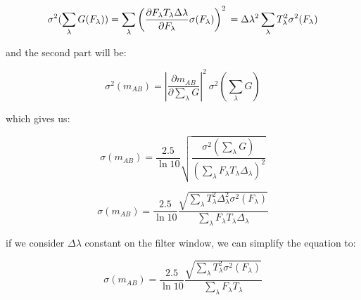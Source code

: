 \documentclass[11pt]{article}
\begin{document}
\begin{equation}
\sigma^2(\sum_\lambda G(F_\lambda))
= \sum_\lambda \left( \frac{\partial F_\lambda T_\lambda \Delta\lambda}{\partial F_\lambda} \sigma(F_\lambda) \right)^2 \\
= \Delta\lambda^2 \sum_\lambda T^2_\lambda \sigma^2(F_\lambda)
\end{equation}

\newpage{}

and the second part will be:

\begin{equation}
\sigma^2(m_{AB}) = \left|\frac{\partial m_{AB}}{\partial \sum_\lambda G}\right|^2\ \sigma^2 \left(\sum_\lambda G \right)
\end{equation}

which gives us:

\begin{equation}
\sigma(m_{AB}) = \frac{2.5}{\ln 10} \sqrt{\frac{ \sigma^2(\sum_\lambda G) }{\left(\sum_\lambda F_\lambda T_\lambda \Delta_\lambda\right)^2}}
\end{equation}

\begin{equation}
\sigma(m_{AB}) = \frac{2.5}{\ln 10} \frac{\sqrt{\sum_\lambda T^2_\lambda \Delta^2_\lambda \sigma^2(F_\lambda)}}
				                         {\sum_\lambda F_\lambda T_\lambda \Delta_\lambda}
\end{equation}

if we consider $\Delta \lambda$ constant on the filter window, we can simplify the equation to:

\begin{equation}
\sigma(m_{AB}) = \frac{2.5}{\ln 10} \frac{\sqrt{\sum_\lambda T^2_\lambda\sigma^2(F_\lambda)}}
											{   {\sum_\lambda F_\lambda T_\lambda} }
\end{equation}
\end{document}
